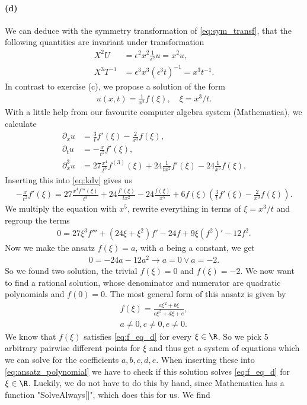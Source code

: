 \paragraph{(d)}
We  can deduce with the symmetry transformation of \cref{eq:sym_transf}, that the following quantities are invariant under transformation
\begin{align}
X^2U&=\epsilon^2x^2\frac{1}{\epsilon^2} u = x^2u,\\
X^3T^{-1}&=\epsilon^3x^3(\epsilon^3t)^{-1}=x^3t^{-1}.
\end{align}
In contrast to exercise (c), we propose a solution of the form
\begin{align}
u(x,t) = \frac{1}{x^2}f(\xi),\quad \xi=x^3/t.
\end{align}
With a little help from our favourite computer algebra system (Mathematica), we calculate
\begin{align}
\partial_x u&=\frac 3t f'\left(\xi\right)-\frac{2}{x^3}f\left(\xi\right),\\
\partial_t u&=-\frac{x}{t^2}f'\left(\xi\right),\\
\partial^3_x u&=27 \frac{x^4}{t^3} f^{(3)}\left(\xi\right)+24\frac{1}{tx^2}f'\left(\xi\right)-24\frac{1}{x^5}f\left(\xi\right).
\end{align}
Inserting this into \cref{eq:kdv} gives us 
\begin{align}
-\frac{x}{t^2} f'(\xi)= 27\frac{x^4f'''(\xi)}{t^3} + 24 \frac{f'(\xi)}{tx^2} - 24 \frac{f(\xi)}{x^5} +6f(\xi)(\frac 3t f'(\xi)-\frac{2}{x^3}f(\xi)).
\end{align}
We multiply the equation with $x^5$, rewrite everything in terms of $\xi=x^3/t$ and regroup the terms
\begin{align}
0= 27 \xi^3 f''' + (24\xi+\xi^2) f' - 24 f + 9\xi(f^2)' - 12f^2.\label{eq:f_eq_d}
\end{align} 
Now we make the ansatz $f(\xi)=a$, with $a$ being a constant, we get
\begin{align}
0=-24a-12a^2
\rightarrow a=0 \vee a= -2.
\end{align}
So we found two solution, the trivial $f(\xi)=0$ and $f(\xi)=-2$.
We now want to find a rational solution, whose denominator and numerator are quadratic polynomials and $f(0)=0$. The most general form of this ansatz is given by
\begin{align}
f(\xi)=\frac{a\xi^2+b\xi}{c\xi^2+d\xi+e},\label{eq:ansatz_polynomial}\\
a\neq 0, c\neq 0, e\neq0.
\end{align}
We know that $f(\xi)$ satisfies \cref{eq:f_eq_d} for every $\xi\in\R$. So we pick 5 arbitrary pairwise different points for $\xi$ and thus get a system of equations which we can solve for the coefficients $a,b,c,d,e$. When inserting these into  \cref{eq:ansatz_polynomial} we have to check if this solution solves \cref{eq:f_eq_d} for $\xi\in\R$. Luckily, we do not have to do this by hand, since Mathematica has a function "SolveAlways[]", which does this for us. We find
